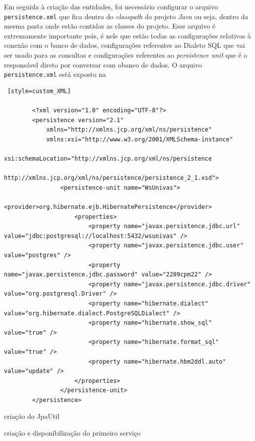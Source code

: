 			\par Em seguida à criação das entidades, foi necessário configurar o arquivo
		\texttt{persistence.xml} que fica dentro do \textit{classpath} do projeto
		\textit{Java} ou seja, dentro da mesma pasta onde estão contidas as classes do
		projeto. Esse arquivo é extremamente importante pois, é nele que estão todas
		as configurações relativas à conexão com o banco de dados, configurações
		referentes ao Dialeto SQL que vai ser usado para as consultas e configurações
		referentes ao \textit{persistence unit} que é o responsável direto por
		conversar com obanco de dados. O arquivo \texttt{persistence.xml} está exposto
		na 
	
  \begin{lstlisting} [style=custom_XML]

		<?xml version="1.0" encoding="UTF-8"?>
		<persistence version="2.1"
			xmlns="http://xmlns.jcp.org/xml/ns/persistence" 
			xmlns:xsi="http://www.w3.org/2001/XMLSchema-instance"
			xsi:schemaLocation="http://xmlns.jcp.org/xml/ns/persistence
			http://xmlns.jcp.org/xml/ns/persistence/persistence_2_1.xsd">
				<persistence-unit name="WsUnivas">
					<provider>org.hibernate.ejb.HibernatePersistence</provider>
					<properties>
						<property name="javax.persistence.jdbc.url" value="jdbc:postgresql://localhost:5432/wsunivas" />
						<property name="javax.persistence.jdbc.user" value="postgres" />
						<property name="javax.persistence.jdbc.password" value="2289cpm22" />
						<property name="javax.persistence.jdbc.driver" value="org.postgresql.Driver" />
						<property name="hibernate.dialect" value="org.hibernate.dialect.PostgreSQLDialect" />
						<property name="hibernate.show_sql" value="true" />
						<property name="hibernate.format_sql" value="true" />
						<property name="hibernate.hbm2ddl.auto" value="update" />
					</properties>
				</persistence-unit>
		</persistence>
	\end{lstlisting}
		
		
		\par criação do JpaUtil

		\par criação e disponibilização do primeiro serviço

